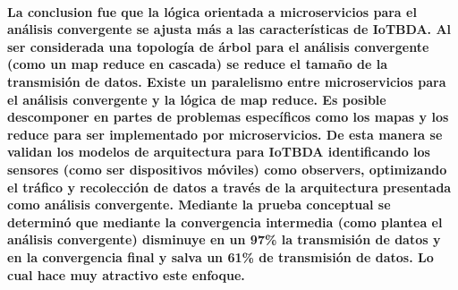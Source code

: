 \paragraph{
    La conclusion fue que la lógica orientada a microservicios para el análisis convergente se ajusta más a las características de IoTBDA. Al ser considerada una topología de árbol para el análisis convergente (como un map reduce en cascada) se reduce el tamaño de la transmisión de datos.
    Existe un paralelismo entre microservicios para el análisis convergente y la lógica de map reduce. Es posible descomponer en partes de problemas específicos como los mapas y los reduce para ser implementado por microservicios.
    De esta manera se validan los modelos de arquitectura para IoTBDA identificando los sensores (como ser dispositivos móviles) como observers, optimizando el tráfico y recolección de datos a través de la arquitectura presentada como análisis convergente.
    Mediante la prueba conceptual se determinó que mediante la convergencia intermedia (como plantea el análisis convergente)  disminuye en un 97\% la transmisión de datos y en la convergencia final y salva un 61\% de transmisión de datos. Lo cual hace muy atractivo este enfoque.
}
